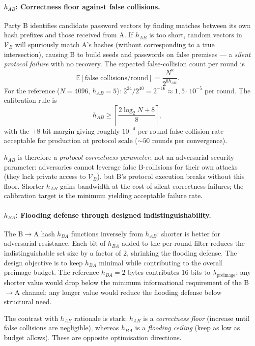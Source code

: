 \documentclass[11pt,a4paper]{article}
\begin{document}
\paragraph{$h_{AB}$: Correctness floor against false collisions.} Party B identifies candidate password vectors by finding matches between its own hash prefixes and those received from A. If $h_{AB}$ is too short, random vectors in $\mathcal{V}_B$ will spuriously match A's hashes (without corresponding to a true intersection), causing B to build seeds and passwords on false premises --- a \emph{silent protocol failure} with no recovery. The expected false-collision count per round is
\[
\mathbb{E}[\text{false collisions}/\text{round}] = \frac{N^2}{2^{8 h_{AB}}}.
\]
For the reference ($N = 4096$, $h_{AB} = 5$): $2^{24}/2^{40} = 2^{-16} \approx 1{,}5 \cdot 10^{-5}$ per round. The calibration rule is
\[
h_{AB} \geq \left\lceil \frac{2 \log_2 N + 8}{8} \right\rceil,
\]
with the $+8$ bit margin giving roughly $10^{-4}$ per-round false-collision rate --- acceptable for production at protocol scale ($\sim 50$ rounds per convergence).

$h_{AB}$ is therefore a \emph{protocol correctness parameter}, not an adversarial-security parameter: adversaries cannot leverage false B-collisions for their own attacks (they lack private access to $\mathcal{V}_B$), but B's protocol execution breaks without this floor. Shorter $h_{AB}$ gains bandwidth at the cost of silent correctness failures; the calibration target is the minimum yielding acceptable failure rate.

\paragraph{$h_{BA}$: Flooding defense through designed indistinguishability.} The B$\to$A hash $h_{BA}$ functions inversely from $h_{AB}$: shorter is better for adversarial resistance. Each bit of $h_{BA}$ added to the per-round filter reduces the indistinguishable set size by a factor of $2$, shrinking the flooding defense. The design objective is to keep $h_{BA}$ minimal while contributing to the overall preimage budget. The reference $h_{BA} = 2$ bytes contributes $16$ bits to $\lambda_\text{preimage}$; any shorter value would drop below the minimum informational requirement of the B$\to$A channel; any longer value would reduce the flooding defense below structural need.

The contrast with $h_{AB}$ rationale is stark: $h_{AB}$ is a \emph{correctness floor} (increase until false collisions are negligible), whereas $h_{BA}$ is a \emph{flooding ceiling} (keep as low as budget allows). These are opposite optimisation directions.
\end{document}
